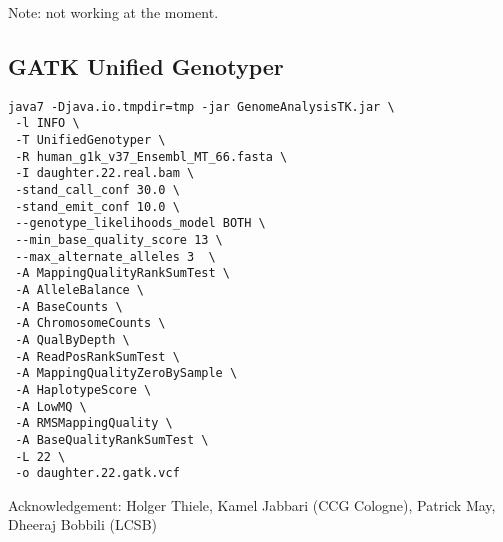 \documentclass{article}
\begin{document}
Note: not working at the moment. 
\subsection{ GATK Unified Genotyper}
\begin{verbatim}
java7 -Djava.io.tmpdir=tmp -jar GenomeAnalysisTK.jar \
 -l INFO \
 -T UnifiedGenotyper \
 -R human_g1k_v37_Ensembl_MT_66.fasta \
 -I daughter.22.real.bam \
 -stand_call_conf 30.0 \
 -stand_emit_conf 10.0 \
 --genotype_likelihoods_model BOTH \
 --min_base_quality_score 13 \
 --max_alternate_alleles 3  \
 -A MappingQualityRankSumTest \
 -A AlleleBalance \
 -A BaseCounts \
 -A ChromosomeCounts \
 -A QualByDepth \
 -A ReadPosRankSumTest \
 -A MappingQualityZeroBySample \
 -A HaplotypeScore \
 -A LowMQ \
 -A RMSMappingQuality \
 -A BaseQualityRankSumTest \
 -L 22 \
 -o daughter.22.gatk.vcf
\end{verbatim} 

Acknowledgement: Holger Thiele, Kamel Jabbari (CCG Cologne), Patrick May, Dheeraj Bobbili (LCSB)
\end{document}
